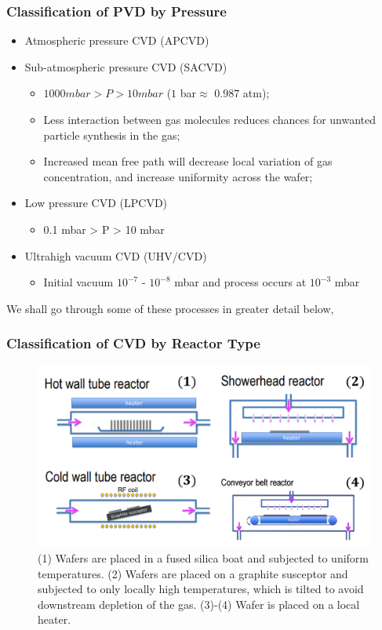 \documentclass[12pt,a4paper]{report}
\begin{document}
\subsubsection{Classification of PVD by Pressure}

\begin{itemize}
    \item Atmospheric pressure CVD (APCVD)
    \item Sub-atmospheric pressure CVD (SACVD)
    \begin{itemize}
        \item $1000 mbar > P > 10 mbar$ ($1$ bar$\approx$ $0.987$ atm);
        \item Less interaction between gas molecules reduces chances for unwanted particle synthesis in the gas;
        \item Increased mean free path will decrease local variation of gas concentration, and increase uniformity across the wafer;
    \end{itemize}
    \item Low pressure CVD (LPCVD)
    \begin{itemize}
        \item 0.1 mbar > P > 10 mbar
    \end{itemize}
    \item Ultrahigh vacuum CVD (UHV/CVD)
    \begin{itemize}
        \item Initial vacuum $10^{-7}$ - $10^{-8}$ mbar and process occurs at $10^{-3}$ mbar
    \end{itemize}
\end{itemize}

We shall go through some of these processes in greater detail below,

\subsubsection{Classification of CVD by Reactor Type}

\begin{figure}[H]
    \centering
    \includegraphics[width=1\linewidth]{cvd reactor type.png}
    \caption{(1) Wafers are placed in a fused silica boat and subjected to uniform temperatures. (2) Wafers are placed on a graphite susceptor and subjected to only locally high temperatures, which is tilted to avoid downstream depletion of the gas. (3)-(4) Wafer is placed on a local heater.}
    \label{fig:my_label}
\end{figure}
\end{document}
